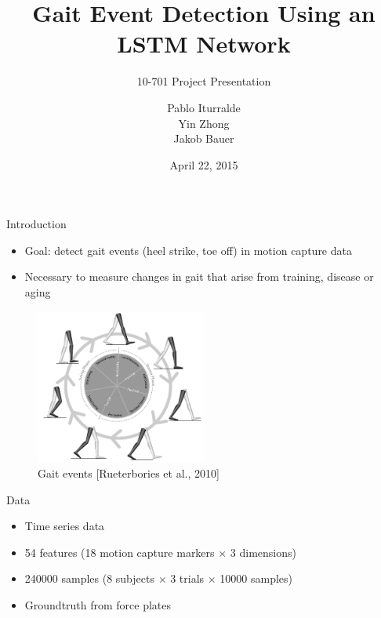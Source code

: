 \documentclass{beamer}
\title
{
    Gait Event Detection Using an LSTM Network
}
\subtitle
{
    10-701
    Project Presentation
}
\author
{
    Pablo Iturralde\\
    Yin Zhong\\
    Jakob Bauer
}
\date
{
    April 22, 2015
}
\begin{document}
\begin{frame}
  \titlepage
\end{frame}

\begin{frame}{Introduction}
    \begin{itemize}
        \item
            Goal: detect gait events (heel strike, toe off) 
            in motion capture data
        \item
            Necessary to measure changes in gait that arise from training,
            disease or aging
    \end{itemize}
    \begin{figure}
    \begin{center}
        \includegraphics[width=0.5\textwidth]{figures/gait_events.jpg}
        \caption{Gait events [Rueterbories et al., 2010]}
        \label{fig:gait_events}
    \end{center}
    \end{figure}
\end{frame}

\begin{frame}{Data}
    \begin{itemize}
        \item
            Time series data
        \item
            54 features 
            (18 motion capture markers $\times$ 3 dimensions)
        \item
            \num{240000} samples 
            (8 subjects $\times$ 3 trials $\times$ \num{10000} samples)
        \item
            Groundtruth from force plates
    \end{itemize}
\end{frame}
\end{document}
